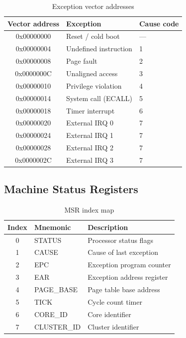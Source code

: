 \documentclass[11pt,a4paper]{article}
\begin{document}
\begin{table}[H]
\centering
\caption{Exception vector addresses}
\begin{tabular}{cll}
\toprule
Vector address & Exception       & Cause code \\
\midrule
0x00000000 & Reset / cold boot        & ---  \\
0x00000004 & Undefined instruction    & 1    \\
0x00000008 & Page fault               & 2    \\
0x0000000C & Unaligned access         & 3    \\
0x00000010 & Privilege violation      & 4    \\
0x00000014 & System call (ECALL)      & 5    \\
0x00000018 & Timer interrupt          & 6    \\
0x00000020 & External IRQ 0           & 7    \\
0x00000024 & External IRQ 1           & 7    \\
0x00000028 & External IRQ 2           & 7    \\
0x0000002C & External IRQ 3           & 7    \\
\bottomrule
\end{tabular}
\end{table}

\subsection{Machine Status Registers}
\begin{table}[H]
\centering
\caption{MSR index map}
\begin{tabular}{cll}
\toprule
Index & Mnemonic  & Description \\
\midrule
0     & STATUS    & Processor status flags \\
1     & CAUSE     & Cause of last exception \\
2     & EPC       & Exception program counter \\
3     & EAR       & Exception address register \\
4     & PAGE\_BASE & Page table base address \\
5     & TICK      & Cycle count timer \\
6     & CORE\_ID  & Core identifier \\
7     & CLUSTER\_ID & Cluster identifier \\
\bottomrule
\end{tabular}
\end{table}
\end{document}
